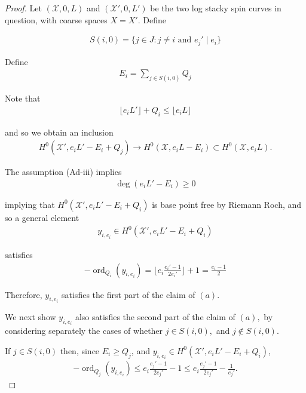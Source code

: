 \documentclass{amsart}
\theoremstyle{plain}
\theoremstyle{definition}
\theoremstyle{remark}
\numberwithin{equation}{section}
\newcommand \sx{\mathscr X}
\DeclareMathOperator{\ord}{ord}
\newcommand \subhalf[1]{\frac{{#1} - 1}{2{#1}}}
\begin{document}
\begin{proof}
Let $(\sx, 0, L)$ and $(\sx', 0, L')$ be the two log stacky spin curves in 
question, with coarse spaces $X = X'$. 
Define

\begin{align*}
	S(i,0) = \{j \in J : j \neq i \text{ and }e_j' \mid e_i\}
\end{align*}

\noindent
Define
\begin{align*}
	E_i = \sum_{j \in S(i,0)}^{}Q_j
\end{align*}

\noindent
Note that
\begin{align*}
	\lfloor e_i L' \rfloor + Q_i \leq \lfloor e_i L \rfloor 
\end{align*}

\noindent
and so we obtain an inclusion
\begin{align*}
	H^0(\sx',e_iL'-E_i + Q_j) \rightarrow H^0(\sx,e_iL - E_i) \subset 
H^0(\sx,e_iL).
\end{align*}

\noindent
The assumption (Ad-iii) implies
\begin{align*}
	\deg \left( e_i L' - E_i \right) \geq 0
\end{align*}

\noindent
implying that $H^0(\sx',e_iL'-E_i + Q_i)$ is base point free by 
Riemann Roch, and so a general element
\begin{align*}
	y_{i,e_i} \in H^0(\sx',e_iL'-E_i + Q_i)
\end{align*}

\noindent
satisfies
\begin{align*}
	-\ord_{Q_i}(y_{i,e_i}) = \lfloor e_i \subhalf {e_i'} \rfloor +1 =
	\frac{e_i - 1}{2}
\end{align*}

\noindent
Therefore, $y_{i,e_i}$ satisfies the first part of the claim of $(a)$.

We next show $y_{i,e_i}$ also satisfies the second part of the
claim of $(a),$ by considering separately the cases of whether $j
\in S(i,0),$ and $j \notin S(i,0)$.

If $j \in S(i,0)$ then, since $E_i \geq Q_j$, and $y_{i,e_i} \in H^0
(\sx',e_iL'-E_i + Q_i)$,
\begin{align*}
	-\ord_{Q_j}(y_{i,e_i}) \leq e_i\subhalf {e_j'} - 1 \leq e_i 
	\subhalf{e_j'} - \frac{1}{e_j'}.
\end{align*}


\end{proof}
\end{document}
